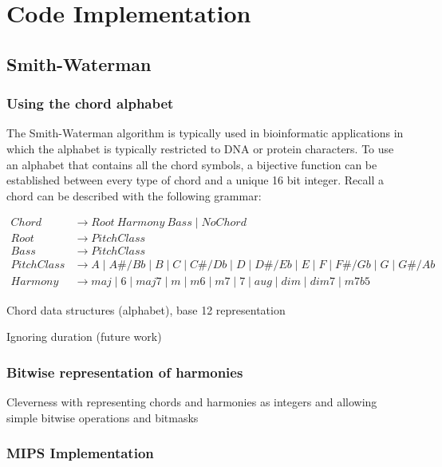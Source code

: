\chapter{Code Implementation}

\section{Smith-Waterman}

\subsection{Using the chord alphabet}

The Smith-Waterman algorithm is typically used in bioinformatic applications in which the alphabet is typically restricted to DNA or protein characters. To use an alphabet that contains all the chord symbols, a bijective function can be established between every type of chord and a unique 16 bit integer. Recall a chord can be described with the following grammar:

\begin{align*}
Chord &\to Root\ Harmony \ Bass \mid NoChord \\
Root &\to PitchClass \\
Bass &\to PitchClass \\
PitchClass &\to A \mid A\#/Bb \mid B \mid C \mid C\#/Db \mid D \mid D\#/Eb \mid E \mid F \mid F\#/Gb \mid G \mid G\#/Ab \\
Harmony &\to maj \mid 6 \mid maj7 \mid m \mid m6 \mid m7 \mid 7 \mid aug \mid dim \mid dim7 \mid m7b5
\end{align*}

\item Chord data structures (alphabet), base 12 representation

\item Ignoring duration (future work)

\subsection{Bitwise representation of harmonies}

\item Cleverness with representing chords and harmonies as integers and allowing simple bitwise operations and bitmasks

\subsection{MIPS Implementation}


